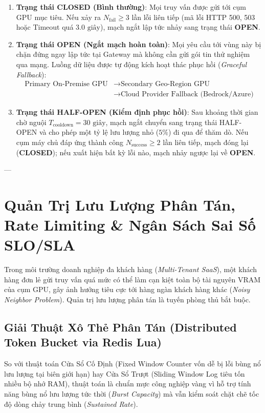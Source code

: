 \begin{enumerate}
  \item \textbf{Trạng thái CLOSED (Bình thường)}: Mọi truy vấn được gửi tới cụm GPU mục tiêu. Nếu xảy ra $N_{\text{fail}} \ge 3$ lần lỗi liên tiếp (mã lỗi HTTP 500, 503 hoặc Timeout quá $3.0\text{ giây}$), mạch ngắt lập tức nhảy sang trạng thái \textbf{OPEN}.
  \item \textbf{Trạng thái OPEN (Ngắt mạch hoàn toàn)}: Mọi yêu cầu tới vùng này bị chặn đứng ngay lập tức tại Gateway mà không cần gửi gói tin thử nghiệm qua mạng. Luồng dữ liệu được tự động kích hoạt thác phục hồi (\textit{Graceful Fallback}):
  \begin{align*}
  \text{Primary On-Premise GPU} &\longrightarrow \text{Secondary Geo-Region GPU} \\
  &\longrightarrow \text{Cloud Provider Fallback (Bedrock/Azure)}
  \end{align*}
  \item \textbf{Trạng thái HALF-OPEN (Kiểm định phục hồi)}: Sau khoảng thời gian chờ nguội $T_{\text{cooldown}} = 30\text{ giây}$, mạch ngắt chuyển sang trạng thái HALF-OPEN và cho phép một tỷ lệ lưu lượng nhỏ ($5\%$) đi qua để thăm dò. Nếu cụm máy chủ đáp ứng thành công $N_{\text{success}} \ge 2$ lần liên tiếp, mạch đóng lại (\textbf{CLOSED}); nếu xuất hiện bất kỳ lỗi nào, mạch nhảy ngược lại về \textbf{OPEN}.
\end{enumerate}

---

\section{Quản Trị Lưu Lượng Phân Tán, Rate Limiting \& Ngân Sách Sai Số SLO/SLA}
\label{sec:ch13-rate-limiting-slo}

Trong môi trường doanh nghiệp đa khách hàng (\textit{Multi-Tenant SaaS}), một khách hàng đơn lẻ gửi truy vấn quá mức có thể làm cạn kiệt toàn bộ tài nguyên VRAM của cụm GPU, gây ảnh hưởng tiêu cực tới hàng ngàn khách hàng khác (\textit{Noisy Neighbor Problem}). Quản trị lưu lượng phân tán là tuyến phòng thủ bắt buộc.

\subsection{Giải Thuật Xô Thẻ Phân Tán (Distributed Token Bucket via Redis Lua)}
So với thuật toán Cửa Sổ Cố Định (Fixed Window Counter vốn dễ bị lỗi bùng nổ lưu lượng tại biên giới hạn) hay Cửa Sổ Trượt (Sliding Window Log tiêu tốn nhiều bộ nhớ RAM), thuật toán  là chuẩn mực công nghiệp vàng vì hỗ trợ tính năng bùng nổ lưu lượng tức thời (\textit{Burst Capacity}) mà vẫn kiểm soát chặt chẽ tốc độ dòng chảy trung bình (\textit{Sustained Rate}).

